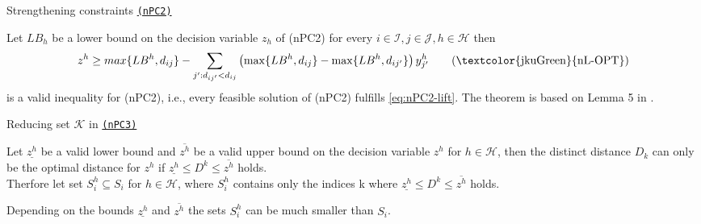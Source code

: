 \documentclass[utf8,aspectratio=169,ngerman,english]{beamer}
\renewcommand{\emph}[1]{\textcolor{jkuGreen}{#1}}
\newcommand{\nPC}{\hyperref[eq:nPC]{\texttt{(nPC1)}}\xspace}
\newcommand{\nPCE}{\hyperref[eq:nPCE]{\texttt{(nPC3)}}\xspace}
\newcommand{\nPCY}{\hyperref[eq:nPCY]{\texttt{(nPC2)}}\xspace}
\begin{document}
\begin{frame}{Strengthening constraints \nPCY} \pause
    \vspace{-2pt}
    \begin{lemma}\label{theorem:strength}
        Let $LB_h$ be a lower bound on the decision variable $z_h$ of (nPC2) for every $i \in \mathcal I, j \in \mathcal J, h \in \mathcal H$ then \pause
        \begin{equation}
            z^h \geq max\{LB^h, d_{ij}\} - \sum_{j':d_{ij'} < d_{ij}} \left(\max \{\textit{$LB^h$}, d_{ij}\} - \max \{\textit{$LB^h$}, d_{ij'}\}\right)y_{j'}^h  \label{eq:nPC2-lift} \tag{\emph{nL-OPT}}
        \end{equation} \pause
        is a valid inequality for (nPC2), i.e., every feasible solution of (nPC2) fulfills \eqref{eq:nPC2-lift}.
        The theorem is based on Lemma 5 in \textcite{GAAR2022}.
    \end{lemma} 
\end{frame}

\begin{frame}{Reducing set $\mathcal K$ in \nPCE} \pause
    \begin{lemma}\label{lemma:setK}
        Let $\underline{z^h}$ be a valid lower bound and $\overline{z^h}$ be a valid upper bound on the decision variable $z^h$ for $h \in \mathcal H$, then
        the distinct distance $D_k$ can only be the optimal distance for $z^h$ if $\underline{z^h} \leq D^k \leq \overline{z^h}$ holds.  \\ \pause
        Therfore let set $S_i^h \subseteq S_i$ for $h \in \mathcal H$, where $S_i^h$ contains only the indices k where $\underline{z^h} \leq D^k \leq \overline{z^h}$ holds.
    \end{lemma}
    Depending on the bounds $\underline{z^h}$ and $\overline{z^h}$ the sets $S_i^h$ can be much smaller than $S_i$.
\end{frame}
\end{document}
